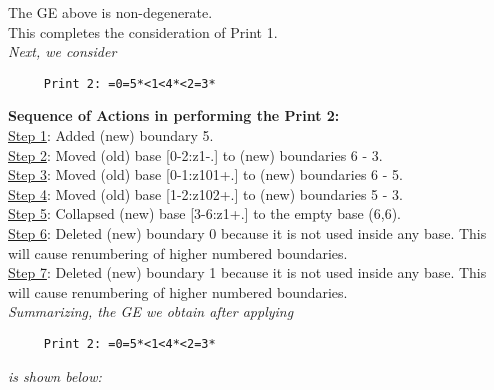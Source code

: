 \documentclass[final]{article}
\begin{document}
The GE above is non-degenerate.\\[0.1in]
This completes the consideration of Print 1.\\[0.1in]
{\em Next, we consider}
\begin{verbatim}
     Print 2: =0=5*<1<4*<2=3*
\end{verbatim}
{\bf Sequence of Actions in performing the Print 2:}\\
{\underline{Step 1}:} Added (new) boundary 5.\\
{\underline{Step 2}:} Moved (old) base [0-2:z1-.]  to (new) boundaries 6 - 3.\\
{\underline{Step 3}:} Moved (old) base [0-1:z101+.]  to (new) boundaries 6 - 5.\\
{\underline{Step 4}:} Moved (old) base [1-2:z102+.]  to (new) boundaries 5 - 3.\\
{\underline{Step 5}:} Collapsed (new) base [3-6:z1+.]  to the empty base (6,6).
\\
{\underline{Step 6}:} Deleted (new) boundary 0 because it is not used inside any base.  This will cause renumbering of higher numbered boundaries.
\\
{\underline{Step 7}:} Deleted (new) boundary 1 because it is not used inside any base.  This will cause renumbering of higher numbered boundaries.
\\[0.1in]
{\em Summarizing, the GE we obtain after applying}
\begin{verbatim}
     Print 2: =0=5*<1<4*<2=3*
\end{verbatim}
{\em is shown below:}
\end{document}
